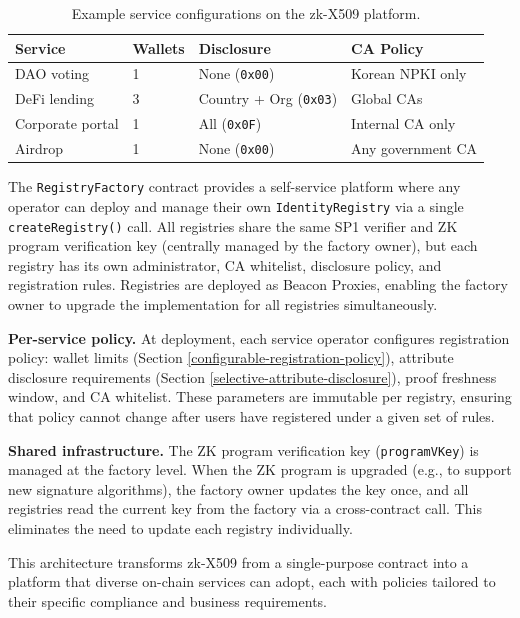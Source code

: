 \documentclass[11pt, a4paper]{article}
\begin{document}
\begin{table}[ht]
\centering
\small
\caption{Example service configurations on the zk-X509 platform.}
\label{tab:platform-examples}
\begin{tabular}{@{}llll@{}}
\toprule
Service & Wallets & Disclosure & CA Policy \\
\midrule
DAO voting & 1 & None (\texttt{0x00}) & Korean NPKI only \\
DeFi lending & 3 & Country + Org (\texttt{0x03}) & Global CAs \\
Corporate portal & 1 & All (\texttt{0x0F}) & Internal CA only \\
Airdrop & 1 & None (\texttt{0x00}) & Any government CA \\
\bottomrule
\end{tabular}
\end{table}

The \texttt{RegistryFactory} contract provides a self-service platform
where any operator can deploy and manage their own
\texttt{IdentityRegistry} via a single \texttt{createRegistry()} call.
All registries share the same SP1 verifier and ZK program verification
key (centrally managed by the factory owner), but each registry has its
own administrator, CA whitelist, disclosure policy, and registration
rules. Registries are deployed as Beacon Proxies, enabling the factory
owner to upgrade the implementation for all registries simultaneously.

\textbf{Per-service policy.} At deployment, each service operator
configures registration policy: wallet limits (Section
\ref{configurable-registration-policy}), attribute disclosure
requirements (Section \ref{selective-attribute-disclosure}), proof
freshness window, and CA whitelist. These parameters are immutable per
registry, ensuring that policy cannot change after users have registered
under a given set of rules.

\textbf{Shared infrastructure.} The ZK program verification key
(\texttt{programVKey}) is managed at the factory level. When the ZK
program is upgraded (e.g., to support new signature algorithms), the
factory owner updates the key once, and all registries read the current
key from the factory via a cross-contract call. This eliminates the need
to update each registry individually.

This architecture transforms zk-X509 from a single-purpose contract
into a platform that diverse on-chain services can adopt, each with
policies tailored to their specific compliance and business requirements.
\end{document}
